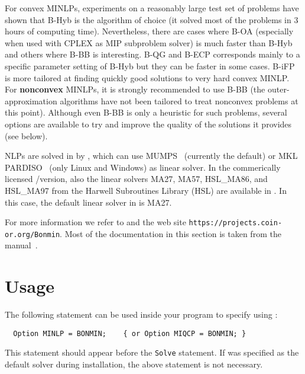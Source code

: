 For convex MINLPs, experiments on a reasonably large test set of problems have shown that B-Hyb is the algorithm of choice (it solved most of the problems in 3 hours of computing time).
Nevertheless, there are cases where B-OA (especially when used with CPLEX as MIP subproblem solver) is much faster than B-Hyb and others where B-BB is interesting.
B-QG and B-ECP corresponds mainly to a specific parameter setting of B-Hyb but they can be faster in some cases.
B-iFP is more tailored at finding quickly good solutions to very hard convex MINLP.
For \textbf{nonconvex} MINLPs, it is strongly recommended to use B-BB (the outer-approximation algorithms have not been tailored to treat nonconvex problems at this point).
Although even B-BB is only a heuristic for such problems, several options are available to try and improve the quality of the solutions it provides (see below).

NLPs are solved in \BONMIN by \IPOPT, which can use \textsc{MUMPS}~\cite{bonminAmestoyDuffKosterLExcellent2001,bonminAmestoyGuermoucheLExcellentPralet2006} (currently the default) or \textsc{MKL PARDISO}~\cite{bonminSchGa04,bonminSchGa06} (only Linux and Windows) as linear solver.
In the commerically licensed \GAMS/\BONMINH version, also the linear solvers \textsc{MA27}, \textsc{MA57}, \textsc{HSL\_MA86}, and \textsc{HSL\_MA97} from the Harwell Subroutines Library (HSL) are available in \IPOPT.
In this case, the default linear solver in \IPOPT is MA27.


For more information we refer to \cite{BoCoLoMa06,BoGo08,BoKiLi09,BBCCGLLLMSW} and the \BONMIN web site \texttt{https://projects.coin-or.org/Bonmin}.
Most of the \BONMIN documentation in this section is taken from the \BONMIN manual~\cite{BonminManual}.



\section{Usage}

The following statement can be used inside your \GAMS program to specify using \BONMIN:
\begin{verbatim}
  Option MINLP = BONMIN;    { or Option MIQCP = BONMIN; }
\end{verbatim}
This statement should appear before the \texttt{Solve} statement.
If \BONMIN was specified as the default solver during \GAMS installation, the above statement is not necessary.

